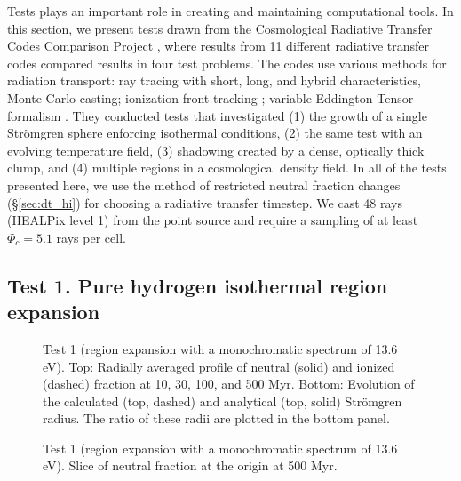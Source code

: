 \documentclass[useAMS,usenatbib,a4paper]{mn2e}
\begin{document}
Tests plays an important role in creating and maintaining
computational tools.  In this section, we present tests drawn from the
Cosmological Radiative Transfer Codes Comparison Project \citep{RT06},
where results from 11 different radiative transfer codes compared
results in four test problems.  The codes use various methods for
radiation transport: ray tracing with short, long, and hybrid
characteristics, Monte Carlo casting; ionization front tracking
\citep{Alvarez06_IFT}; variable Eddington Tensor formalism
\citep{Gnedin01_OTVET}.  They conducted tests that investigated (1)
the growth of a single Str\"{o}mgren sphere enforcing isothermal
conditions, (2) the same test with an evolving temperature field, (3)
shadowing created by a dense, optically thick clump, and (4) multiple
\hii regions in a cosmological density field.  In all of the
tests presented here, we use the method of restricted neutral fraction
changes (\S\ref{sec:dt_hi}) for choosing a radiative transfer
timestep.  We cast 48 rays (HEALPix level 1) from the point source and
require a sampling of at least $\Phi_c = 5.1$ rays per cell.

\subsection{Test 1. Pure hydrogen isothermal \hii region
  expansion}
\label{sec:test1}

\begin{figure}
  \caption{\label{fig:test1_ifront} Test 1 (\hii region
    expansion with a monochromatic spectrum of 13.6 eV).  Top:
    Radially averaged profile of neutral (solid) and ionized (dashed)
    fraction at 10, 30, 100, and 500 Myr.  Bottom: Evolution of the
    calculated (top, dashed) and analytical (top, solid) Str\"{o}mgren
    radius.  The ratio of these radii are plotted in the bottom panel.}
\end{figure}

\begin{figure}
  \caption{\label{fig:test1_HI} Test 1 (\hii region expansion
    with a monochromatic spectrum of 13.6 eV). Slice of neutral
    fraction at the origin at 500 Myr.}
\end{figure}
\end{document}
